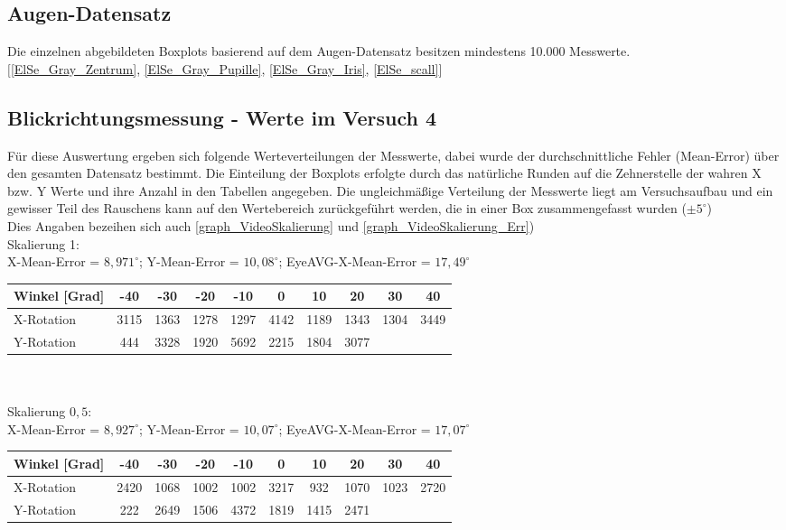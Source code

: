 \subsection{Augen-Datensatz \cite{database_Eye}}
Die einzelnen abgebildeten Boxplots basierend auf dem Augen-Datensatz \cite{database_Eye} besitzen mindestens 10.000 Messwerte.\\
$[$\autoref{ElSe_Gray_Zentrum}, \autoref{ElSe_Gray_Pupille}, \autoref{ElSe_Gray_Iris}, \autoref{ElSe_scall}$]$
\subsection{Blickrichtungsmessung - Werte im Versuch 4}
Für diese Auswertung ergeben sich folgende Werteverteilungen der Messwerte, dabei wurde der durchschnittliche Fehler (Mean-Error) über den gesamten Datensatz bestimmt. Die Einteilung der Boxplots erfolgte durch das natürliche Runden auf die Zehnerstelle der wahren X bzw. Y Werte und ihre Anzahl in den Tabellen angegeben. Die ungleichmäßige Verteilung der Messwerte liegt am Versuchsaufbau und ein gewisser Teil des Rauschens kann auf den Wertebereich zurückgeführt werden, die in einer Box zusammengefasst wurden ($\pm 5^\circ$)\\
Dies Angaben bezeihen sich auch  \autoref{graph_VideoSkalierung} und \autoref{graph_VideoSkalierung_Err})\\
Skalierung 1:\\
X-Mean-Error = $8,971^\circ$; Y-Mean-Error = $10,08^\circ$; EyeAVG-X-Mean-Error = $17,49^\circ$\\
\begin{tabular}{|l|c|c|c|c|c|c|c|c|c|}
	\hline 
	Winkel [Grad]&-40&-30&-20&-10&0&10&20&30&40\\
	\hline 
	X-Rotation&3115&1363&1278&1297&4142&1189&1343&1304&3449\\ 
	\hline 
	Y-Rotation&444&3328&1920&5692&2215&1804&3077&&\\
	\hline
\end{tabular}\\\\
Skalierung $0,5$:\\
X-Mean-Error = $8,927^\circ$; Y-Mean-Error = $10,07^\circ$; EyeAVG-X-Mean-Error = $17,07^\circ$\\
\begin{tabular}{|l|c|c|c|c|c|c|c|c|c|}
	\hline 
	Winkel [Grad]&-40&-30&-20&-10&0&10&20&30&40\\
	\hline 
	X-Rotation&2420&1068&1002&1002&3217&932&1070&1023&2720\\ 
	\hline 
	Y-Rotation&222&2649&1506&4372&1819&1415&2471&&\\
	\hline
\end{tabular}
